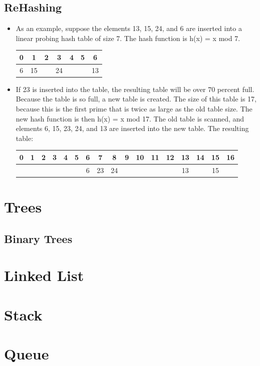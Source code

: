 \documentclass[a4paper,oneside]{book}
\begin{document}
\section{ReHashing}
\begin{itemize}
  \item As an example, suppose the elements 13, 15, 24, and 6 are inserted into a linear
probing hash table of size 7. The hash function is h(x) = x mod 7.
\begin{tabular}[H]{|ccccccc|}
\hline
0 & 1 & 2 & 3 & 4 & 5 & 6 \\ \hline
6 & 15  &   & 24  &   &   &  13 \\ \hline 
\end{tabular}
\item If 23 is inserted into the table, the resulting table will be over 70 percent
full. Because the table is so full, a new table is created. The size of this table is 17, because
this is the first prime that is twice as large as the old table size. The new hash function is
then h(x) = x mod 17. The old table is scanned, and elements 6, 15, 23, 24, and 13 are
inserted into the new table. The resulting table:\\
\begin{tabular}[H]{|ccccccccccccccccc|}
\hline
0 & 1 & 2 & 3 & 4 & 5 & 6 & 7 & 8 & 9 & 10 & 11 & 12 & 13 & 14 & 15 & 16 \\ \hline 
  &   &   &   &   &   & 6 & 23 & 24 &  &  &  &  & 13 &  & 15 &  \\ \hline
\end{tabular}
\end{itemize}
\chapter{Trees}
\section{Binary Trees}
\begin{definition}
	
\end{definition}
\chapter{Linked List}
\chapter{Stack}
\chapter{Queue}
\end{document}

